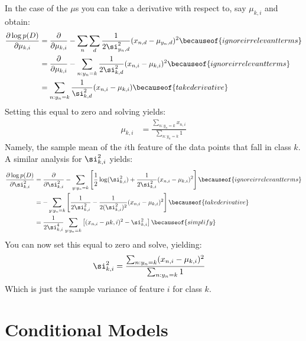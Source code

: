 In the case of the $\mu$s you can take a derivative with respect to,
say $\mu_{k,i}$ and obtain:
%
\begin{align}
   \frac {\partial \log p(D)} {\partial \mu_{k,i}}
&= \frac {\partial} {\partial \mu_{k,i}}
     - \sum_n \sum_d \frac 1 {2 \si_{y_n,d}^2} (x_{n,d} - \mu_{y_n,d})^2
   \becauseof{ignore irrelevant terms} \\
&= \frac {\partial} {\partial \mu_{k,i}}
     - \sum_{n:y_n=k} \frac 1 {2 \si_{k,d}^2} (x_{n,i} - \mu_{k,i})^2
   \becauseof{ignore irrelevant terms} \\
&= \sum_{n:y_n=k} \frac 1 {\si_{k,d}^2} (x_{n,i} - \mu_{k,i})
   \becauseof{take derivative}
\end{align}
%
Setting this equal to zero and solving yields:
%
\begin{align}
  \mu_{k,i} &= \frac {\sum_{n:y_n=k} x_{n,i}} {\sum_{n:y_n=k} 1}
\end{align}
%
Namely, the sample mean of the $i$th feature of the data points that
fall in class $k$.  A similar analysis for $\si_{k,i}^2$ yields:
%
\begin{align}
   \frac {\partial \log p(D)} {\partial \si^2_{k,i}}
&= \frac {\partial} {\partial \si^2_{k,i}}
     - \sum_{y:y_n=k} \left[ \frac 1 2 \log(\si_{k,i}^2) +
                            \frac 1 {2 \si_{k,i}^2} (x_{n,i} - \mu_{k,i})^2\right]
   \becauseof{ignore irrelevant terms} \\
&= - \sum_{y:y_n=k} \left[
       \frac 1 {2 \si_{k,i}^2}
     - \frac 1 {2 (\si_{k,i}^2)^2} (x_{n,i} - \mu_{k,i})^2 \right]
   \becauseof{take derivative} \\
&= \frac 1 {2 \si_{k,i}^4} \sum_{y:y_n=k} \left[ (x_{n,i} - \mu{k,i})^2 - \si_{k,i}^2 \right]
   \becauseof{simplify}
\end{align}
%
You can now set this equal to zero and solve, yielding:
%
\begin{align}
  \si_{k,i}^2 &=
    \frac {\sum_{n:y_n=k} (x_{n,i}-\mu_{k,i})^2} {\sum_{n:y_n=k} 1}
\end{align}
%
Which is just the sample variance of feature $i$ for class $k$.


\section{Conditional Models}

